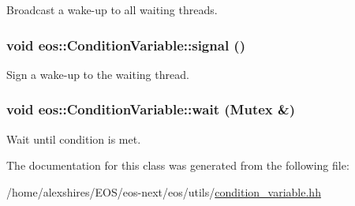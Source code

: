 Broadcast a wake-\/up to all waiting threads. \hypertarget{classeos_1_1ConditionVariable_a58e81670564c2096dcfdbf34dba8f4a4}{
\subsubsection[{signal}]{\setlength{\rightskip}{0pt plus 5cm}void eos::ConditionVariable::signal ()}}
\label{classeos_1_1ConditionVariable_a58e81670564c2096dcfdbf34dba8f4a4}


Sign a wake-\/up to the waiting thread. \hypertarget{classeos_1_1ConditionVariable_a42313d0ec24908e952f8b675a966a6a6}{
\subsubsection[{wait}]{\setlength{\rightskip}{0pt plus 5cm}void eos::ConditionVariable::wait ({\bf Mutex} \&)}}
\label{classeos_1_1ConditionVariable_a42313d0ec24908e952f8b675a966a6a6}


Wait until condition is met. 

The documentation for this class was generated from the following file:\begin{DoxyCompactItemize}
\item 
/home/alexshires/EOS/eos-\/next/eos/utils/\hyperlink{condition__variable_8hh}{condition\_\-variable.hh}\end{DoxyCompactItemize}

